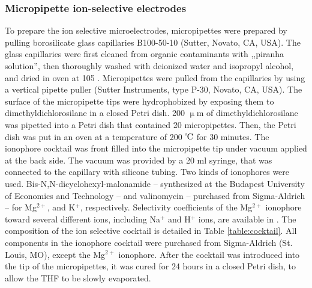 	\subsubsection{Micropipette ion-selective electrodes}
To prepare the ion selective microelectrodes, micropipettes were prepared by pulling bo\-ro\-si\-li\-cate glass capillaries B100-50-10 (Sutter, Novato, CA, USA).
The glass capillaries were first cleaned from organic contaminants with ,,piranha solution'', then thoroughly washed with deionized water and isopropyl alcohol, and dried in oven at 105 \celsius.
Micropipettes were pulled from the capillaries by using a vertical pipette puller (Sutter Instruments, type P-30, Novato, CA, USA).
The surface of the micropipette tips were hydrophobized by exposing them to dimethyldichlorosilane in a closed Petri dish. 200 $\upmu$m of dimethyldichlorosilane was pipetted into a Petri dish that contained 20 micropipettes. Then, the Petri dish was put in an oven at a temperature of 200 $\celsius $ for 30 minutes.
The ionophore cocktail was front filled into the micropipette tip under vacuum applied at the back side. The vacuum was provided by a 20 ml syringe, that was connected to the capillary with silicone tubing.
Two kinds of ionophores were used.
Bis-N,N-dicyclohexyl-malonamide -- synthesized at the Budapest University of Economics and Technology \cite{toth1993analytical} -- and valinomycin -- purchased from Sigma-Aldrich -- for Mg$^{2+}$, and K$^+$, respectively.
Selectivity coefficients of the Mg$^{2+}$ ionophore toward several different ions, including Na$^+$ and H$^+$ ions, are available in \cite{toth1993analytical}.
The composition of the ion selective cocktail is detailed in Table \ref{table:cocktail}.
All components in the ionophore cocktail were purchased from Sigma-Aldrich (St. Louis, MO), except the Mg$^{2+}$ ionophore.
After the cocktail was introduced into the tip of the micropipettes, it was cured for 24 hours in a closed Petri dish, to allow the THF to be slowly evaporated. 
				
